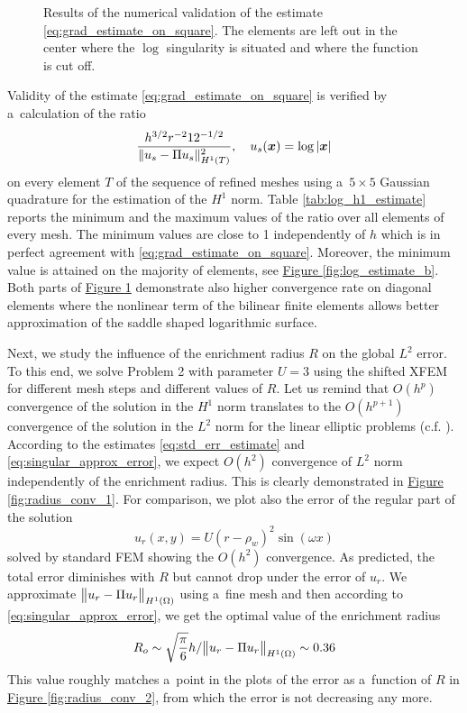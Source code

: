 \documentclass[FM,Dis]{tulthesis}
\newcommand{\fig}[1]{\hyperref[#1]{Figure \ref{#1}}}
\newcommand{\results}{results/}
\begin{document}
%
\begin{figure}[!htb]
  \centering    
  \hspace{0pt}
  \caption[Log error estimate.]
  {
  Results of the numerical validation of the estimate \eqref{eq:grad_estimate_on_square}. The elements are left out 
  in the center where the $\log$ singularity is situated and where the function is cut off.
  }
  \label{fig:log_estimate}
\end{figure}
%
Validity of the estimate \eqref{eq:grad_estimate_on_square} is verified by a~calculation of the ratio
\begin{equation} \label{eqn:log_h1_estimate_ratio}
\frac{h^{3/2} r^{-2} 12^{-1/2}}{\|u_s - \Pi u_s\|^2_{H^1(T)}},\quad u_s(\mathbf{\boldsymbol{x}}) = \log \left|\mathbf{\boldsymbol{x}}\right|
\end{equation}
on every element $T$ of the sequence of refined meshes using a~$5\times5$ Gaussian quadrature for the estimation of the $H^1$ norm. Table 
\ref{tab:log_h1_estimate} reports the minimum and the maximum values of the ratio over all elements of every mesh.
The minimum values are close to 1 independently of $h$ which is in perfect agreement with \eqref{eq:grad_estimate_on_square}.
Moreover, the minimum value is attained on the majority of
elements, see \fig{fig:log_estimate_b}. Both parts of \fig{fig:log_estimate} demonstrate also higher convergence rate on diagonal elements
where the nonlinear term of the bilinear finite elements allows better approximation of the saddle shaped logarithmic surface.

Next, we study the influence of the enrichment radius $R$ on the global $L^2$ error. To this end, we solve Problem 2 with parameter $U=3$
using the shifted XFEM for different mesh steps and different values of $R$.
Let us remind that $O(h^p)$ convergence of the solution in the $H^1$ norm translates to the $O(h^{p+1})$ convergence of the solution in the $L^2$ norm 
for the linear elliptic problems (c.f. \cite[Theorem 19.2]{ciarlet_basic_1991}). According to the estimates \eqref{eq:std_err_estimate}
and \eqref{eq:singular_approx_error}, we expect $O(h^2)$ convergence of $L^2$ norm independently of the enrichment radius. This is 
clearly demonstrated in \fig{fig:radius_conv_1}. For comparison, we plot also the error of the regular part of the solution
\[
  u_r(x,y) = U(r-\rho_w)^2 \sin(\omega x)
\]
solved by standard FEM showing the $O(h^2)$ convergence.
As predicted, the total error diminishes with $R$ but cannot 
drop under the error of $u_r$. We approximate $\bigl\Vert u_r - \Pi u_r\bigr\Vert_{H^1(\Omega)}$
using a~fine mesh and then according to \eqref{eq:singular_approx_error},
we get the optimal value of the enrichment radius
\[
    R_o \sim \sqrt{\frac{\pi}{6}} h/\bigl\Vert u_r - \Pi u_r\bigr\Vert_{H^1(\Omega)} \sim 0.36
\]
This value roughly matches a~point in the plots of the error as a~function of $R$ in
\fig{fig:radius_conv_2}, from which the error is not decreasing any more.
\end{document}
